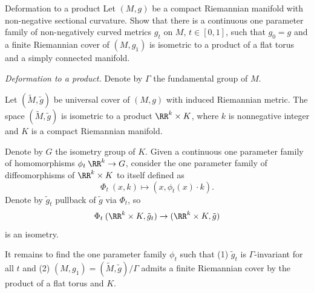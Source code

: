 





















\begin{pr}{}{Deformation to a product}\label{Deformation to a product} 
Let $(M,g)$ be a compact Riemannian manifold with non-negative sectional curvature. 
Show that there is a continuous one parameter family of non-negatively curved metrics $g_t$ on $M$, $t\in[0,1]$, 
such that $g_0=g$ and a finite Riemannian cover of $(M,g_1)$ is isometric to a product of a flat torus and a simply connected manifold.
\end{pr}

\textit{Deformation to a product.} 
Denote by $\Gamma$ the fundamental group of $M$.

Let $(\tilde M,\tilde g)$ be universal cover of $(M,g)$ with induced Riemannian metric.
The space $(\tilde M,\tilde g)$ is isometric to a product $\RR^k\times K$, 
where $k$ is nonnegative integer and $K$ is a compact Riemannian manifold.

Denote by $G$ the isometry group of $K$.
Given a continuous one parameter family of homomorphisms $\phi_t\:\RR^k\to G$,
consider the one parameter family of diffeomorphisms of $\RR^k\times K$ to itself defined as
\[\Phi_t\:(x,k)\mapsto (x,\phi_t(x)\cdot k).\]
Denote by 
 $\tilde g_t$ pullback 
of $\tilde g$ via $\Phi_t$,
so 
\[\Phi_t\:(\RR^k\times K,\tilde g_t)\to (\RR^k\times K,\tilde g)\]
is an isometry.

It remains to find the one parameter family $\phi_t$ such that 
(1) $\tilde g_t$ is $\Gamma$-invariant for all $t$
and (2) $(M,g_1)=(\tilde M,\tilde g)/\Gamma$ admits a finite Riemannian cover by the product of a flat torus and $K$.

